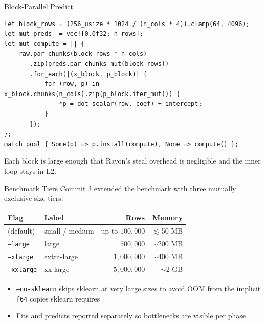 \documentclass[aspectratio=169]{beamer}
\begin{document}
\begin{frame}[fragile]{Block-Parallel Predict}
\begin{lstlisting}
let block_rows = (256_usize * 1024 / (n_cols * 4)).clamp(64, 4096);
let mut preds  = vec![0.0f32; n_rows];
let mut compute = || {
    raw.par_chunks(block_rows * n_cols)
       .zip(preds.par_chunks_mut(block_rows))
       .for_each(|(x_block, p_block)| {
           for (row, p) in x_block.chunks(n_cols).zip(p_block.iter_mut()) {
               *p = dot_scalar(row, coef) + intercept;
           }
       });
};
match pool { Some(p) => p.install(compute), None => compute() };
\end{lstlisting}
  Each block is large enough that Rayon's steal overhead is negligible
  and the inner loop stays in L2.
\end{frame}

\begin{frame}{Benchmark Tiers}
  Commit 3 extended the benchmark with three mutually exclusive size tiers:

  \vspace{0.4em}
  \begin{center}
  \begin{tabular}{llrr}
    \hline
    \textbf{Flag} & \textbf{Label} & \textbf{Rows} & \textbf{Memory} \\
    \hline
    (default) & small / medium & up to $100{,}000$ & $\lesssim$50 MB \\
    \texttt{--large}   & large          & $500{,}000$       & $\sim$200 MB \\
    \texttt{--xlarge}  & extra-large    & $1{,}000{,}000$   & $\sim$400 MB \\
    \texttt{--xxlarge} & xx-large       & $5{,}000{,}000$   & $\sim$2 GB  \\
    \hline
  \end{tabular}
  \end{center}

  \vspace{0.4em}
  \begin{itemize}
    \item \texttt{--no-sklearn} skips sklearn at very large sizes to avoid OOM
      from the implicit \texttt{f64} copies sklearn requires
    \item Fits and predicts reported separately so bottlenecks are visible per phase
  \end{itemize}
\end{frame}

\end{document}
